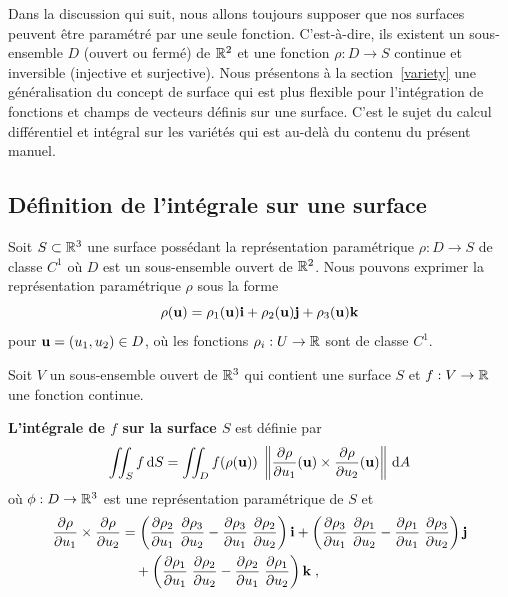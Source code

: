 {Dans la discussion qui suit, nous allons toujours supposer que nos surfaces
peuvent être paramétré par une seule fonction.  C'est-à-dire, ils
existent un sous-ensemble $D$ (ouvert ou fermé) de $\mathbb{R}^2$ et une
fonction $\rho:D \to S$ continue et inversible (injective et
surjective).  Nous présentons à la section~\ref{variety} une généralisation
du concept de surface qui est plus flexible pour l'intégration de
fonctions et champs de vecteurs définis sur une surface.  C'est le
sujet du calcul différentiel et intégral sur les variétés qui est
au-delà du contenu du présent manuel.

\subsection{Définition de l'intégrale sur une surface} 

Soit $S \subset \mathbb{R}^3$ une surface possédant la représentation
paramétrique $\rho:D\rightarrow S$ de classe $C^1$ où $D$ est un
sous-ensemble ouvert de $\mathbb{R}^2$.  Nous pouvons exprimer la représentation
paramétrique $\rho$ sous la forme
\begin{equation} \label{para_surf}
\rho(\mathbf{u}) = \rho_1(\mathbf{u})\mathbf{i} + \rho_2(\mathbf{u})\mathbf{j} + \rho_3(\mathbf{u})\mathbf{k}
\end{equation}
pour $ \mathbf{u} = (u_1,u_2) \in D$, où les fonctions
$\rho_i:U \rightarrow \mathbb{R}$ sont de classe $C^1$.

\begin{focus}{\dfn}
Soit $V$ un sous-ensemble ouvert de $\mathbb{R}^3$ qui contient une surface $S$ et
$f:V\rightarrow \mathbb{R}$ une fonction continue.

{\bfseries L'intégrale de $f$ sur la surface $S$} est définie par
\[
\iint_S  f \,\mathrm{d}S
= \iint_D f(\rho(\mathbf{u}))\;
\left\|\frac{\partial \rho}{\partial u_1}(\mathbf{u}) \times
\frac{\partial \rho}{\partial u_2}(\mathbf{u})\right\| \,\mathrm{d}A
\]
où $\phi:D \to \mathbb{R}^3$ est une représentation paramétrique de $S$ et
\begin{equation*}
\begin{split}
\frac{\partial \rho}{\partial u_1} \times \frac{\partial \rho}{\partial u_2} &
= \left( \frac{\partial \rho_2}{\partial u_1} \; \frac{\partial \rho_3}{\partial u_2} -
\frac{\partial \rho_3}{\partial u_1} \; \frac{\partial \rho_2}{\partial u_2} \right) \mathbf{i} +
\left( \frac{\partial \rho_3}{\partial u_1} \; \frac{\partial \rho_1}{\partial u_2} 
- \frac{\partial \rho_1}{\partial u_1} \; \frac{\partial \rho_3}{\partial u_2} \right) \mathbf{j} \\
&\quad + \left( \frac{\partial \rho_1}{\partial u_1}\; \frac{\partial \rho_2}{\partial u_2}
- \frac{\partial \rho_2}{\partial u_1}\; \frac{\partial \rho_1}{\partial u_2} \right) \mathbf{k} \; ,
\end{split}
\end{equation*}


\end{focus}}
